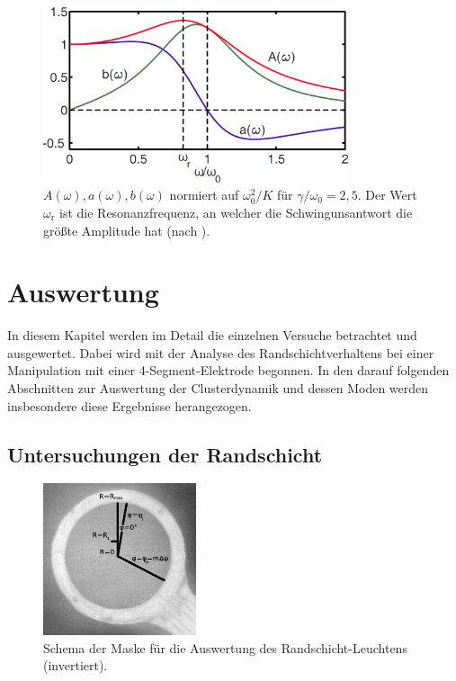 \documentclass[numbers=noenddot,a4paper]{scrartcl}
\newcommand{\ix}[1]{_\text{#1}}
\begin{document}
				\begin{figure}[H]
					\centering
					\includegraphics[width=0.8\textwidth,height=0.4\textwidth]{figs/amplitud.png}
					\caption{$A\left(\omega\right), a\left(\omega\right), b\left(\omega\right)$ normiert auf $\omega\ix{0}^2/K $ für $\gamma/\omega\ix{0}=2,5$. Der Wert $\omega\ix{r}$ ist die Resonanzfrequenz, an welcher die Schwingunsantwort die größte Amplitude hat (nach \cite{Carstensen11}).}
					\label{img:amplitud}
				\end{figure}

	\newpage

	\section{Auswertung}\label{sec:auswert}

		In diesem Kapitel werden im Detail die einzelnen Versuche betrachtet und ausgewertet. Dabei wird mit der Analyse des Randschichtverhaltens bei einer Manipulation mit einer 4-Segment-Elektrode begonnen. In den darauf folgenden Abschnitten zur Auswertung der Clusterdynamik und dessen Moden werden insbesondere diese Ergebnisse herangezogen.

        \subsection{Untersuchungen der Randschicht}

                \begin{figure}
                    \centering
                    \includegraphics[width=0.4\textwidth,height=0.4\textwidth]{figs/auswertung/randanalysemaske.png}
                    \caption{Schema der Maske für die Auswertung des Randschicht-Leuchtens (invertiert).}
                    \label{img:randmaske}
                \end{figure}
\end{document}

